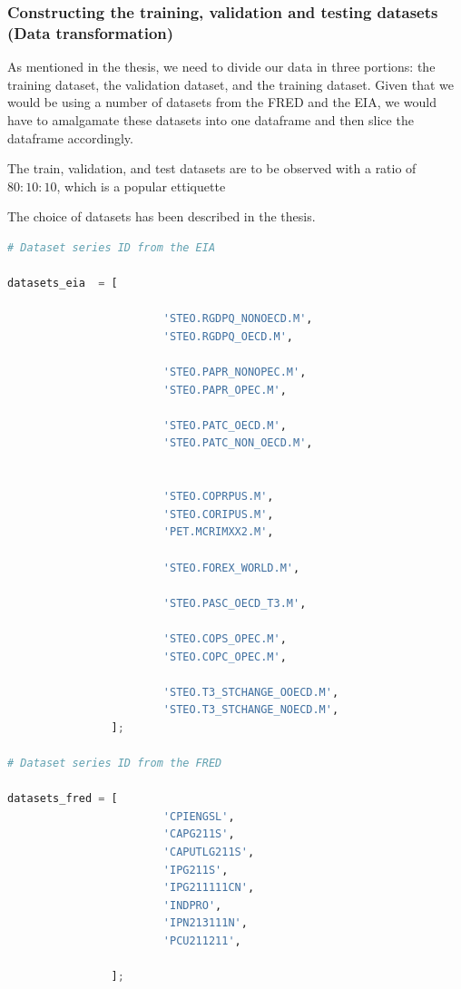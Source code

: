 \hypertarget{constructing-the-training-validation-and-testing-datasets-data-transformation}{%
\subsubsection{Constructing the training, validation and testing
datasets (Data
transformation)}\label{constructing-the-training-validation-and-testing-datasets-data-transformation}}

As mentioned in the thesis, we need to divide our data in three
portions: the training dataset, the validation dataset, and the training
dataset. Given that we would be using a number of datasets from the FRED
and the EIA, we would have to amalgamate these datasets into one
dataframe and then slice the dataframe accordingly.

The train, validation, and test datasets are to be observed with a ratio
of \(80:10:10\), which is a popular ettiquette

The choice of datasets has been described in the thesis.

\begin{lstlisting}[language=Python]
# Dataset series ID from the EIA

datasets_eia  = [
    
                        'STEO.RGDPQ_NONOECD.M',
                        'STEO.RGDPQ_OECD.M',
    
                        'STEO.PAPR_NONOPEC.M',
                        'STEO.PAPR_OPEC.M',
    
                        'STEO.PATC_OECD.M',
                        'STEO.PATC_NON_OECD.M',
                
    
                        'STEO.COPRPUS.M',
                        'STEO.CORIPUS.M',
                        'PET.MCRIMXX2.M',
                        
                        'STEO.FOREX_WORLD.M',
    
                        'STEO.PASC_OECD_T3.M',
    
                        'STEO.COPS_OPEC.M',
                        'STEO.COPC_OPEC.M',
    
                        'STEO.T3_STCHANGE_OOECD.M',
                        'STEO.T3_STCHANGE_NOECD.M',
                ];

# Dataset series ID from the FRED

datasets_fred = [
                        'CPIENGSL',
                        'CAPG211S',
                        'CAPUTLG211S',
                        'IPG211S',
                        'IPG211111CN',
                        'INDPRO',
                        'IPN213111N',
                        'PCU211211',
                
                ];
\end{lstlisting}

